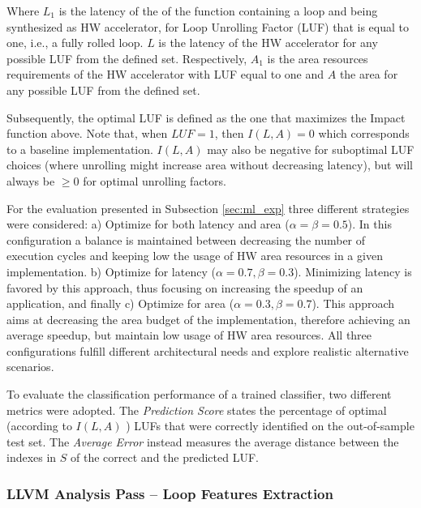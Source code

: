 \documentclass[]{usiinfthesis}
\begin{document}
Where $L_1$ is the latency of the of the function containing a loop and being synthesized as HW 
accelerator, for Loop Unrolling Factor (LUF) that is equal to one, i.e., a fully rolled loop. $L$ 
is the latency of the HW accelerator for any possible LUF from the defined set.
Respectively, $A_1$ is the area resources requirements of the HW accelerator with LUF equal to one and 
$A$ the area for any possible LUF from the defined set.\par

Subsequently, the optimal LUF is defined as the one that maximizes the Impact function above. Note that, 
when $LUF = 1$, then $I(L,A)=0$ which corresponds to a baseline implementation. $I(L,A)$ may also 
be negative for suboptimal LUF choices (where unrolling might increase area without decreasing 
latency), but will always be $\ge 0$ for optimal unrolling factors.\par


For the evaluation presented in Subsection \ref{sec:ml_exp}
three different strategies were considered: a) Optimize for both latency and area ($\alpha = 
\beta = 0.5$). In this configuration a balance is maintained between decreasing the number of 
execution cycles and keeping low the usage of HW area resources in a given implementation.
b) Optimize for latency ($\alpha = 0.7, \beta = 0.3$). Minimizing latency is favored by this
approach, thus focusing on increasing the speedup of an application, and finally c) Optimize
for area ($\alpha = 0.3, \beta = 0.7$). This approach aims at decreasing the area budget of 
the implementation, therefore achieving an average speedup, but maintain low usage of HW 
area resources. All three configurations fulfill different architectural needs and explore 
realistic alternative scenarios.\par

To evaluate the classification performance of a trained classifier, two different metrics were
adopted. The \emph{Prediction Score} states the
percentage of optimal (according to $I(L,A)$ ) LUFs that were correctly
identified on the out-of-sample test set. The \emph{Average Error}
instead measures the average distance between the indexes in $S$ of the
correct and the predicted LUF.


\subsubsection{LLVM Analysis Pass -- Loop Features Extraction}
\end{document}
